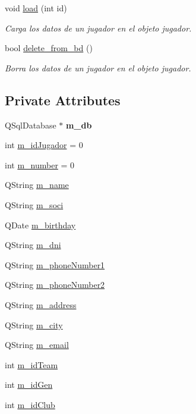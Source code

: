 \begin{DoxyCompactItemize}
void \mbox{\hyperlink{classjugador_a9b57bb55fbd19cf2a1fee8397eeb0135}{load}} (int id)
\begin{DoxyCompactList}\small\item\em Carga los datos de un jugador en el objeto jugador. \end{DoxyCompactList}\item 
bool \mbox{\hyperlink{classjugador_acd83799dcfbff2b813eb6c674ae8e5b2}{delete\+\_\+from\+\_\+bd}} ()
\begin{DoxyCompactList}\small\item\em Borra los datos de un jugador en el objeto jugador. \end{DoxyCompactList}\end{DoxyCompactItemize}
\subsection*{Private Attributes}
\begin{DoxyCompactItemize}
\item 
\mbox{\label{classjugador_a4ec2678f61cfc3fef709cdf7364de864}} 
Q\+Sql\+Database $\ast$ {\bfseries m\+\_\+db}
\item 
int \mbox{\hyperlink{classjugador_a860c4f9519d760185c9387d1aaa878c3}{m\+\_\+id\+Jugador}} = 0
\item 
int \mbox{\hyperlink{classjugador_a7e760c3cafc8d788217705008219b4b5}{m\+\_\+number}} = 0
\item 
Q\+String \mbox{\hyperlink{classjugador_ab53628a425ca9e0beb632f965e3b1242}{m\+\_\+name}}
\item 
Q\+String \mbox{\hyperlink{classjugador_af17085c4ca78df6e7820c46c902a8a44}{m\+\_\+soci}}
\item 
Q\+Date \mbox{\hyperlink{classjugador_aacd583397f387472642e9fd4ac140a82}{m\+\_\+birthday}}
\item 
Q\+String \mbox{\hyperlink{classjugador_ad4740e0c58d680cd43ae162e41b901b9}{m\+\_\+dni}}
\item 
Q\+String \mbox{\hyperlink{classjugador_a1ea251ca9e7696bd7580683e5900d265}{m\+\_\+phone\+Number1}}
\item 
Q\+String \mbox{\hyperlink{classjugador_aed7290d4b5d54775a3ed94304b6f6a30}{m\+\_\+phone\+Number2}}
\item 
Q\+String \mbox{\hyperlink{classjugador_a1b6be8d5abdbf71ab907ba36c67a524f}{m\+\_\+address}}
\item 
Q\+String \mbox{\hyperlink{classjugador_a17b4e71f585da8d1e475e51ed4a7dfd4}{m\+\_\+city}}
\item 
Q\+String \mbox{\hyperlink{classjugador_a86974778b3d88602db5f2aaf5f875fdb}{m\+\_\+email}}
\item 
int \mbox{\hyperlink{classjugador_aee35082fbfb0bbde814adfd2f6f3e4ae}{m\+\_\+id\+Team}}
\item 
int \mbox{\hyperlink{classjugador_a2ff01541fe85cdbc81af2a82e5ca9360}{m\+\_\+id\+Gen}}
\item 
int \mbox{\hyperlink{classjugador_ac2789e004276f7bc979e42f087875340}{m\+\_\+id\+Club}}
\end{DoxyCompactItemize}


